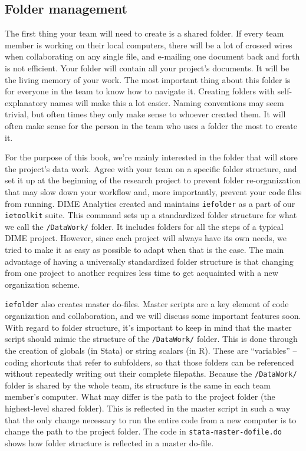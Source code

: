 \subsection{Folder management}

The first thing your team will need to create is a shared folder.
If every team member is working on their local computers,
there will be a lot of crossed wires when collaborating on any single file,
and e-mailing one document back and forth is not efficient.
Your folder will contain all your project's documents.
It will be the living memory of your work.
The most important thing about this folder is for everyone in the team to know how to navigate it.
Creating folders with self-explanatory names will make this a lot easier.
Naming conventions may seem trivial,
but often times they only make sense to whoever created them.
It will often make sense for the person in the team who uses a folder the most to create it.

For the purpose of this book,
we're mainly interested in the folder that will store the project's data work.
Agree with your team on a specific folder structure, and
set it up at the beginning of the research project
to prevent folder re-organization that may slow down your workflow and,
more importantly, prevent your code files from running.
DIME Analytics created and maintains
\texttt{iefolder}
as a part of our \texttt{ietoolkit} suite.
This command sets up a standardized folder structure for what we call the \texttt{/DataWork/} folder.
It includes folders for all the steps of a typical DIME project.
However, since each project will always have its own needs,
we tried to make it as easy as possible to adapt when that is the case.
The main advantage of having a universally standardized folder structure
is that changing from one project to another requires less
time to get acquainted with a new organization scheme.

\texttt{iefolder} also creates master do-files.
Master scripts are a key element of code organization and collaboration,
and we will discuss some important features soon.
With regard to folder structure, it's important to keep in mind
that the master script should mimic the structure of the \texttt{/DataWork/} folder.
This is done through the creation of globals (in Stata) or string scalars (in R).
These are ``variables'' -- coding shortcuts that refer to subfolders,
so that those folders can be referenced without repeatedly writing out their complete filepaths.
Because the \texttt{/DataWork/} folder is shared by the whole team,
its structure is the same in each team member's computer.
What may differ is the path to the project folder (the highest-level shared folder).
This is reflected in the master script in such a way that
the only change necessary to run the entire code from a new computer
is to change the path to the project folder.
The code in \texttt{stata-master-dofile.do} shows how folder structure is reflected in a master do-file.



